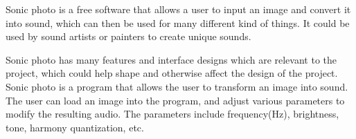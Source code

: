 Sonic photo is a free software that allows a user to input an image and convert it into sound, which can then be used for many different kind of things. It could be used by sound artists or painters to create unique sounds.

Sonic photo has many features and interface designs which are relevant to the project, which could help shape and otherwise affect the design of the project.
Sonic photo is a program that allows the user to transform an image into sound. The user can load an image into the program, and adjust various parameters to modify the resulting audio. The parameters include  frequency(Hz), brightness, tone, harmony quantization, etc.


